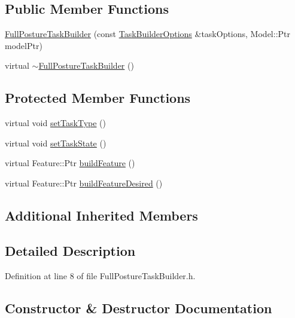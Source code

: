 \subsection*{Public Member Functions}
\begin{DoxyCompactItemize}
\item 
\hyperlink{classocra_1_1FullPostureTaskBuilder_a0b26fe3e55fe1c9881844d34651decea}{Full\+Posture\+Task\+Builder} (const \hyperlink{classocra_1_1TaskBuilderOptions}{Task\+Builder\+Options} \&task\+Options, Model\+::\+Ptr model\+Ptr)
\item 
virtual \hyperlink{classocra_1_1FullPostureTaskBuilder_a4829af35d08e67294aad90e19c70c916}{$\sim$\+Full\+Posture\+Task\+Builder} ()
\end{DoxyCompactItemize}
\subsection*{Protected Member Functions}
\begin{DoxyCompactItemize}
\item 
virtual void \hyperlink{classocra_1_1FullPostureTaskBuilder_a5bae08175fd730b46004ddfccc9a1d8b}{set\+Task\+Type} ()
\item 
virtual void \hyperlink{classocra_1_1FullPostureTaskBuilder_a0f3852057b316baa402806fb320d257b}{set\+Task\+State} ()
\item 
virtual Feature\+::\+Ptr \hyperlink{classocra_1_1FullPostureTaskBuilder_a7651ca4fd2ef7c8096a399b128981122}{build\+Feature} ()
\item 
virtual Feature\+::\+Ptr \hyperlink{classocra_1_1FullPostureTaskBuilder_ac9ea83ee3f872995c6dc214e91fc28a0}{build\+Feature\+Desired} ()
\end{DoxyCompactItemize}
\subsection*{Additional Inherited Members}


\subsection{Detailed Description}


Definition at line 8 of file Full\+Posture\+Task\+Builder.\+h.



\subsection{Constructor \& Destructor Documentation}
